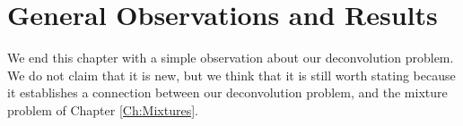 








	

\section{General Observations and Results}
\label{sec:deconvolution observations and results}

We end this chapter with a simple observation about our deconvolution problem. We do not claim that it is new, but we think that it is still worth stating because it establishes a connection between our deconvolution problem, and the mixture problem of Chapter \ref{Ch:Mixtures}.

